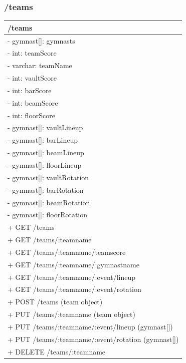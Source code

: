 \documentclass[letterpaper,10pt,draftclsnofoot,onecolumn,]{article}
\begin{document}
\subsubsection{/teams}
\begin{center}
    \begin{tabular}{| p{20em} |}
    \hline
    \textbf{/teams} \\
    \hline
    - gymnast[]: gymnasts \\
    - int: teamScore \\
    - varchar: teamName \\
    - int: vaultScore \\
    - int: barScore \\
    - int: beamScore \\
    - int: floorScore \\
    - gymnast[]: vaultLineup \\
    - gymnast[]: barLineup \\
    - gymnast[]: beamLineup \\
    - gymnast[]: floorLineup \\
    - gymnast[]: vaultRotation \\
    - gymnast[]: barRotation \\
    - gymnast[]: beamRotation \\
    - gymnast[]: floorRotation \\
    \hline
    + GET /teams \\
    + GET /teams/:teamname \\
    + GET /teams/:teamname/teamscore \\
    + GET /teams/:teamname/:gymnastname \\
    + GET /teams/:teamname/:event/lineup \\
    + GET /teams/:teamname/:event/rotation \\
    + POST /teams (team object) \\
    + PUT /teams/:teamname (team object) \\
    + PUT /teams/:teamname/:event/lineup (gymnast[]) \\
    + PUT /teams/:teamname/:event/rotation (gymnast[]) \\
    + DELETE /teams/:teamname \\
    \hline
    \end{tabular}
\end{center}
\end{document}
